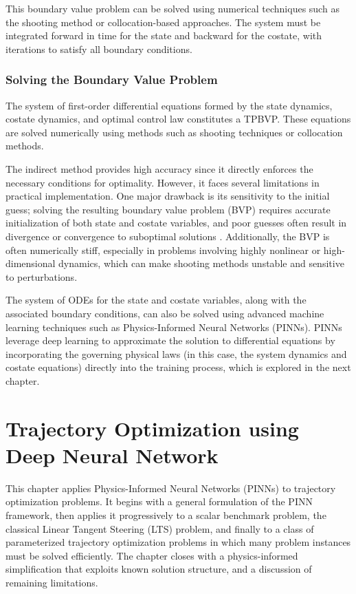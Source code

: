 \documentclass[
  number,
  preprint]{elsarticle}
\begin{document}
This boundary value problem can be solved using numerical techniques
such as the shooting method or collocation-based approaches. The system
must be integrated forward in time for the state and backward for the
costate, with iterations to satisfy all boundary conditions.

\subsubsection{Solving the Boundary Value
Problem}\label{solving-the-boundary-value-problem}

The system of first-order differential equations formed by the state
dynamics, costate dynamics, and optimal control law constitutes a TPBVP.
These equations are solved numerically using methods such as shooting
techniques or collocation methods.

The indirect method provides high accuracy since it directly enforces
the necessary conditions for optimality. However, it faces several
limitations in practical implementation. One major drawback is its
sensitivity to the initial guess; solving the resulting boundary value
problem (BVP) requires accurate initialization of both state and costate
variables, and poor guesses often result in divergence or convergence to
suboptimal solutions \citep{sanchez2018real}. Additionally, the BVP is
often numerically stiff, especially in problems involving highly
nonlinear or high-dimensional dynamics, which can make shooting methods
unstable and sensitive to perturbations.

The system of ODEs for the state and costate variables, along with the
associated boundary conditions, can also be solved using advanced
machine learning techniques such as Physics-Informed Neural Networks
(PINNs). PINNs leverage deep learning to approximate the solution to
differential equations \citep{raissi2019physics} by incorporating the
governing physical laws (in this case, the system dynamics and costate
equations) directly into the training process, which is explored in the
next chapter.

\newpage

\section{Trajectory Optimization using Deep Neural
Network}\label{trajectory-optimization-using-deep-neural-network}

This chapter applies Physics-Informed Neural Networks (PINNs) to
trajectory optimization problems. It begins with a general formulation
of the PINN framework, then applies it progressively to a scalar
benchmark problem, the classical Linear Tangent Steering (LTS) problem,
and finally to a class of parameterized trajectory optimization problems
in which many problem instances must be solved efficiently. The chapter
closes with a physics-informed simplification that exploits known
solution structure, and a discussion of remaining limitations.
\end{document}
